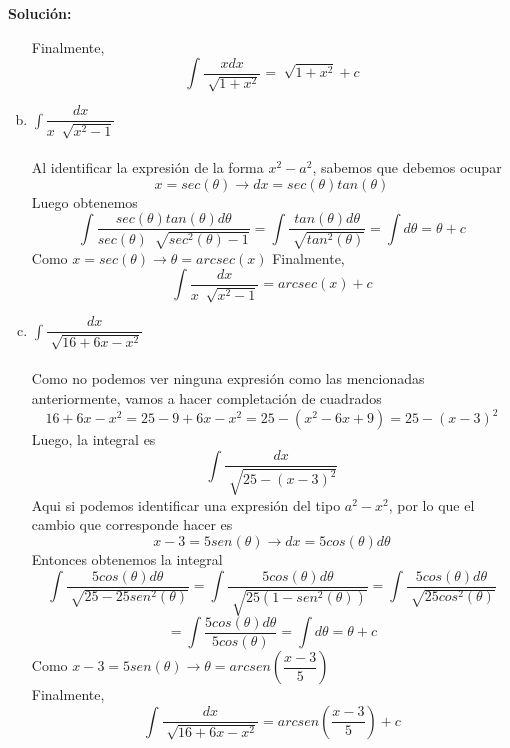 \documentclass[12pt]{article}
\newenvironment{solucion}
{\begin{mdframed}[backgroundcolor=black!10]
		{\bf Solución:}\\
	}
	{
	\end{mdframed}
}
\newenvironment{preguntas}
{\begin{enumerate}\itemsep12pt
	}
	{
	\end{enumerate}
}
\newcommand{\ra}{\rightarrow}
\begin{document}
\begin{preguntas}
\begin{solucion}
\begin{enumerate}[a)]
\begin{center}
			\end{center}
			Finalmente, 
			$$\displaystyle\int \dfrac{xdx}{\sqrt[]{1+x^2}} = \sqrt[]{1+x^2} + c$$
\item $\displaystyle\int \dfrac{dx}{x\ \sqrt[]{x^2-1}}$\\\\
			Al identificar la expresión de la forma $x^2-a^2$, sabemos que debemos ocupar
			$$x = sec(\theta) \ra dx = sec(\theta)tan(\theta)$$
			Luego obtenemos
			$$\displaystyle\int \dfrac{sec(\theta)tan(\theta)d\theta}{sec(\theta)\ \sqrt[]{sec^2(\theta)-1}}
			= \displaystyle\int \dfrac{tan(\theta)d\theta}{\sqrt[]{tan^2(\theta)}}
			= \displaystyle\int d\theta = \theta + c$$
			Como $x = sec(\theta) \ra \theta = arcsec(x)$
			Finalmente,
			$$\displaystyle\int \dfrac{dx}{x\ \sqrt[]{x^2-1}} = arcsec(x) + c$$
\item $\displaystyle\int \dfrac{dx}{\sqrt[]{16+6x-x^2}}$\\\\
			Como no podemos ver ninguna expresión como las mencionadas anteriormente, vamos a hacer completación de cuadrados
			$$16+6x-x^2 = 25 - 9 + 6x - x^2 = 25 - (x^2-6x+9) = 25 - (x-3)^2$$
			Luego, la integral es
			$$\displaystyle\int \dfrac{dx}{\sqrt[]{25 - (x-3)^2}}$$
			Aqui si podemos identificar una expresión del tipo $a^2-x^2$, por lo que el cambio que corresponde hacer es
			$$x-3 = 5sen(\theta) \ra dx = 5cos(\theta)d\theta$$
			Entonces obtenemos la integral
			$$\displaystyle\int \dfrac{5cos(\theta)d\theta}{\sqrt[]{25 - 25sen^2(\theta)}}
			=\displaystyle\int \dfrac{5cos(\theta)d\theta}{\sqrt[]{25(1 - sen^2(\theta))}}
			=\displaystyle\int \dfrac{5cos(\theta)d\theta}{\sqrt[]{25cos^2(\theta)}}$$
			$$=\displaystyle\int \dfrac{5cos(\theta)d\theta}{5cos(\theta)} 
			= \displaystyle\int d\theta = \theta + c$$
			Como $x-3 = 5sen(\theta) \ra \theta = arcsen\left(\dfrac{x-3}{5}\right)$\\
			Finalmente,
			$$\displaystyle\int \dfrac{dx}{\sqrt[]{16+6x-x^2}} = arcsen\left(\dfrac{x-3}{5}\right) + c$$

\end{enumerate}
\end{solucion}
\end{preguntas}
\end{document}

